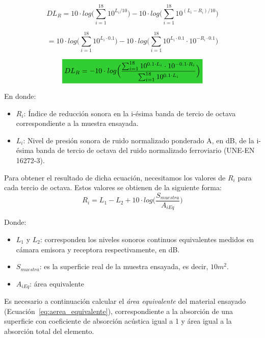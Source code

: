 $$
        DL_R  = 10 \cdot log \Big(\sum^{18}_{i=1} 10^{{L_i}/{10}} \Big) -10 \cdot log  \Big( \sum_{i=1}^{18} 10^{(L_i - R_i)/{10}} \Big) $$
    
$$
        = 10 \cdot log \Big(\sum^{18}_{i=1} 10^{{L_i}\cdot0.1} \Big) -10 \cdot log  \Big( \sum_{i=1}^{18} 10^{L_i\cdot0.1} \cdot 10^{-R_i\cdot0.1} \Big) $$
    
\begin{equation}
        \mathcolorbox{EQColor}{DL_R = -10\cdot log \Big( \frac{\sum_{i=1}^{18} 10^{0.1 \cdot L_i} \cdot 10^{-0.1 \cdot R_i}}{\sum^{18}_{i=1} 10^{0.1 \cdot L_i} }\Big)}
    \label{eq:DL_R}
\end{equation}

\par En donde:
\begin{itemize}
    \item $R_i$: Índice de reducción sonora en la i-ésima banda de tercio de octava correspondiente a la muestra ensayada.
    \item $L_i$: Nivel de presión sonora de ruido normalizado ponderado A, en dB, de la i-ésima banda de tercio de octava del ruido normalizado ferroviario (UNE-EN 16272-3).
\end{itemize}
    

\par Para obtener el resultado de dicha ecuación, necesitamos los valores de $R_i$ para cada tercio de octava. Estos valores se obtienen de la siguiente forma:
\begin{equation}
    R_i = L_1 - L_2 + 10 \cdot log \Big(\frac{S_{muestra}}{A_{iEq}}\Big)
    \label{eq:indice_reduccion_sonora}
\end{equation}

\par Donde:
\begin{itemize}
    \item $L_1$ y $L_2$: corresponden los niveles sonoros continuos equivalentes medidos en cámara emisora y receptora respectivamente, en dB.
    \item $S_{muestra}$: es la superficie real de la muestra ensayada, es decir, $10m^2$.
    \item $A_{iEq}$: área equivalente
\end{itemize}

\par Es necesario a continuación calcular el \textit{área equivalente} del material ensayado (Ecuación~\eqref{eq:aerea_equivalente}), correspondiente a la absorción de una superficie con coeficiente de absorción acústica igual a 1 y área igual a la absorción total del elemento. 

